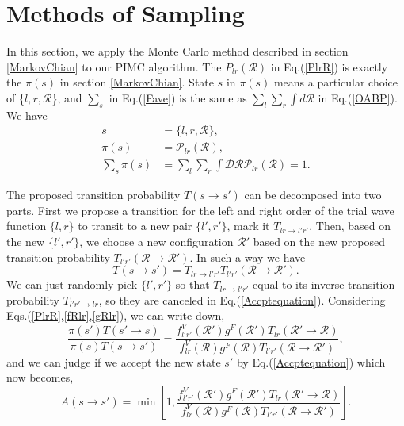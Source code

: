 \documentclass[12pt,letterpaper,UTF8]{report}
\begin{document}
\section{Methods of Sampling}
\label{secSamplingMethod}

In this section, we apply the Monte Carlo method described in section \ref{MarkovChian} to our PIMC algorithm. The $P_{lr} (\mathcal{R})$ in Eq.(\ref{PlrR}) is exactly the $\pi(s)$ in section \ref{MarkovChian}. State $s$ in $\pi(s)$ means a particular choice of \{$l,r,\mathcal{R}$\}, and $\sum_s$ in Eq.(\ref{Fave}) is the same as $\sum_l \sum_r \int d \mathcal{R}$ in Eq.(\ref{OABP}). We have
\begin{align}
s &= \{ l,r,\mathcal{R} \},
\label{state_s}\\
\pi(s)  &= \mathcal{P}_{lr}(\mathcal{R}), \\
\sum_s \pi(s) &= \sum_l \sum_r \int \mathcal{DR} \mathcal{P}_{lr}(\mathcal{R}) =1 .
\end{align}

The proposed transition probability $T(s \rightarrow s')$ can be decomposed into two parts. First we propose a transition for the left and right order of the trial wave function $\{ l,r \}$ to transit to a new pair $\{ l',r' \}$, mark it $T_{lr \rightarrow l'r'}$.
Then, based on the new $\{ l',r' \}$, we choose a new configuration $\mathcal{R}'$ based on the new proposed transition probability $T_{l'r'}(\mathcal{R} \rightarrow \mathcal{R}')$. In such a way we have
\begin{equation}
T(s \rightarrow s') = T_{lr \rightarrow l'r'} T_{l'r'}(\mathcal{R} \rightarrow \mathcal{R}').
\end{equation}
We can just randomly pick $\{l',r'\}$ so that $T_{lr \rightarrow l'r'}$ equal to its inverse transition probability $T_{l'r' \rightarrow lr} $, so they are canceled in Eq.(\ref{Accptequation}). Considering Eqs.(\ref{PlrR},\ref{fRlr},\ref{gRlr}), we can write down,
\begin{equation}
\frac{\pi(s')T(s'\rightarrow s)}{\pi(s) T(s\rightarrow s')} = \frac{ f^V_{l'r'}(\mathcal{R}') g^F(\mathcal{R}')  T_{lr}(\mathcal{R}' \rightarrow \mathcal{R})  }
{ f^V_{lr}(\mathcal{R}) g^F(\mathcal{R}) T_{l'r'}(\mathcal{R} \rightarrow \mathcal{R}') }, \label{Acc2}
\end{equation}
and we can judge if we accept the new state $s'$ by Eq.(\ref{Accptequation}) which now becomes,
\begin{equation}
A (s\rightarrow s') \! = \!
\min \! \left[  1,
\frac{ f^V_{l'r'}(\mathcal{R}') g^F(\mathcal{R}')  T_{lr}(\mathcal{R}' \! \rightarrow \! \mathcal{R})  }
{ f^V_{lr}(\mathcal{R}) g^F(\mathcal{R}) T_{l'r'}(\mathcal{R} \! \rightarrow \! \mathcal{R}') }
\right] .
\label{Accptequationdetail1}
\end{equation}
\end{document}
